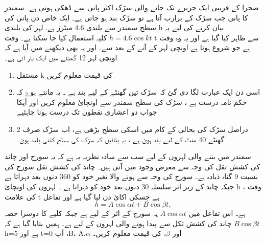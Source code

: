 صحرا کے قریبی ایک جزیرے تک جانے والی سڑک اکثر پانی سے ڈھکی ہوتی ہے۔ سمندر کا پانی جب سڑک کے برارب آتا ہے تو سڑک بند ہو جاتی ہے۔ ایک خاص دن پانی کی سطح سمندر سے بلندی 4.6 میٹرز ہے.   لہر کی بلندی  h  بیان کرنے کی لیے یہ  \(h=4.6\cos kt \) کلیہ استعمال کیا جا سکتا ہے۔ وقت  t  سے ظاہر کیا گیا ہے اور یہ وہ وقت ہے جو شروع ہوتا ہے اونچی لہر کے آنے کے بعد سے۔ اور یہ بھی دیکھنے میں آیا ہے کہ اونچی لہر 12 گھنٹے میں ایک بار آتی ہے۔
\begin{enumerate} 
\item 
  مستقل   k    کی قیمت معلوم کریں
\item
اسی دن ایک عبارت لگا دی گئ کہ سڑک تین گھنٹے کے لیے بند ہے ۔ یہ مانتے ہوۓ کہ حکم نامہ درست ہے ، سڑک کی سطح سمندر سے اونچائ معلوم کریں اور آپکا جواب دو اعشاری نقطوں تک درست ہونا چاہئیے
\item
دراصل سڑک کی بحالی کے کام میں اسکی سطح بڑھی ہے، اب سڑک صرف 2 گھنٹے 40 منٹ کے لیے بند ہوئ ہے ، یہ بتائیں کہ سڑک کی سطح کتنی بلند ہوئ۔
\end{enumerate}
 

سمندر میں بننے والی لہروں کے لیے سب سے سادہ نظریہ یہ ہے کہ یہ سورج اور چاند کی کشش ثقل کی وجہ سے معرض وجود میں آتی ہیں۔ چاند کی کشش ثقل سورج کی نسبت 9 گناہ ذیادہ ہے۔ سورج کی وجہ سے ہونے والا تغیر خود کو 360 دنوں بعد دہراتا ہے جبکہ چاند کے زیر اثر سلسلہ 30 دنوں بعد خود کو دہراتا ہے ۔ لہروں کی اونچائ h ، وقت کی علامت  t    ہے جسکی اکائ دن لیا گیا ہے
اور تفاعل  \[h= A\cos\alpha t+B\cos\beta t, \]  ہے۔
اس تفاعل میں \(A\cos\alpha t \)  یہ سورج کے اثر کے لیے ہے جبکہ کلیے کا دوسرا حصہ \(B\cos\beta t \) چاند کی کشش ثکل سے پیدا ہونے والی لہروں کے لیے ہے۔ ہمیں بتایا گیا ہے کہ 
 h=5   
ہے اور  t=0 آپ ،B، A،\(\alpha \)  اور  \(\beta \)، کی قیمت معلوم کریں۔ 
     









 









